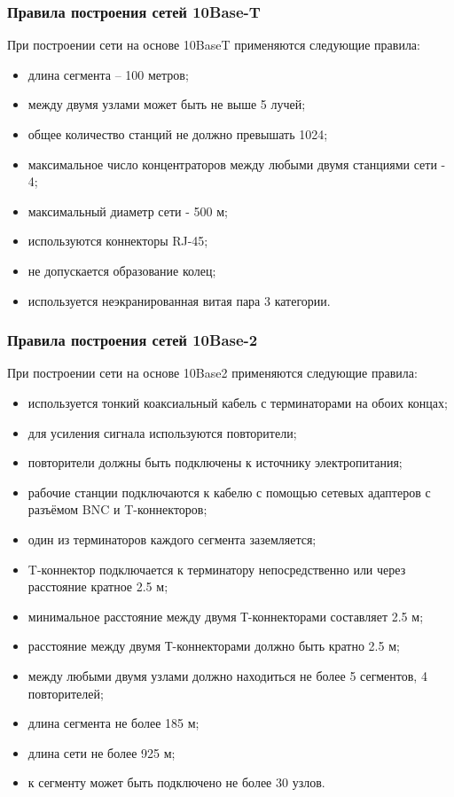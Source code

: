 \documentclass[russian,utf8,emptystyle]{eskdtext}
\begin{document}
\subsubsection{Правила построения сетей 10Base-T}
При построении сети на основе 10BaseT применяются следующие правила:
\begin{itemize}[label=-]
\item длина сегмента – 100 метров;
\item между двумя узлами может быть не выше 5 лучей;
\item общее количество станций не должно превышать 1024;
\item максимальное число концентраторов между любыми двумя станциями сети - 4;
\item максимальный диаметр сети - 500 м;
\item используются коннекторы RJ-45;
\item не допускается образование колец;
\item используется неэкранированная витая пара 3 категории.
\end{itemize}

\subsubsection{Правила построения сетей 10Base-2}
При построении сети на основе 10Base2 применяются следующие правила:
\begin{itemize}[label=-]
\item используется тонкий коаксиальный кабель с терминаторами на обоих концах;
\item для усиления сигнала используются повторители;
\item повторители должны быть подключены к источнику электропитания;
\item рабочие станции подключаются к кабелю с помощью сетевых адаптеров с разъёмом BNC и T-коннекторов;
\item один из терминаторов каждого сегмента заземляется;
\item T-коннектор подключается к терминатору непосредственно или через расстояние кратное 2.5 м;
\item минимальное расстояние между двумя Т-коннекторами составляет 2.5 м;
\item расстояние между двумя Т-коннекторами должно быть кратно 2.5 м;
\item между любыми двумя узлами должно находиться не более 5 сегментов, 4 повторителей;
\item длина сегмента не более 185 м;
\item длина сети не более 925 м;
\item к сегменту может быть подключено не более 30 узлов.
\end{itemize}
\end{document}
